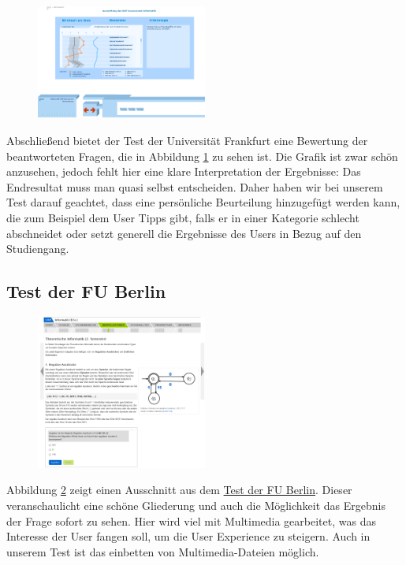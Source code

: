 \begin{figure}[htbp] 
  \centering
     \includegraphics[width=0.5\textwidth]{Jonas_Images/frankfurt2.png}
  \caption{}
  \label{fig:Bild2}
\end{figure}
Abschließend bietet der Test der Universität Frankfurt eine Bewertung der beantworteten Fragen, die in Abbildung \ref{fig:Bild2} zu sehen ist. Die Grafik ist zwar schön anzusehen, jedoch fehlt hier eine klare Interpretation der Ergebnisse: Das Endresultat muss man quasi selbst entscheiden. Daher haben wir bei unserem Test darauf geachtet, dass eine persönliche Beurteilung hinzugefügt werden kann, die zum Beispiel dem User Tipps gibt, falls er in einer Kategorie schlecht abschneidet oder setzt generell die Ergebnisse des Users in Bezug auf den Studiengang.
\subsection{Test der FU Berlin}
\begin{figure}[htbp] 
  \centering
     \includegraphics[width=0.5\textwidth]{Jonas_Images/berlin.png}
  \caption{}
  \label{fig:Bild3}
\end{figure}
Abbildung \ref{fig:Bild3} zeigt einen Ausschnitt aus dem  \href{https://www.osa.fu-berlin.de/informatik/start/startseite/index.html}{Test der FU Berlin}. Dieser veranschaulicht eine schöne Gliederung und auch die Möglichkeit das Ergebnis der Frage sofort zu sehen. Hier wird viel mit Multimedia gearbeitet, was das Interesse der User fangen soll, um die User Experience zu steigern. Auch in unserem Test ist das einbetten von Multimedia-Dateien möglich.
